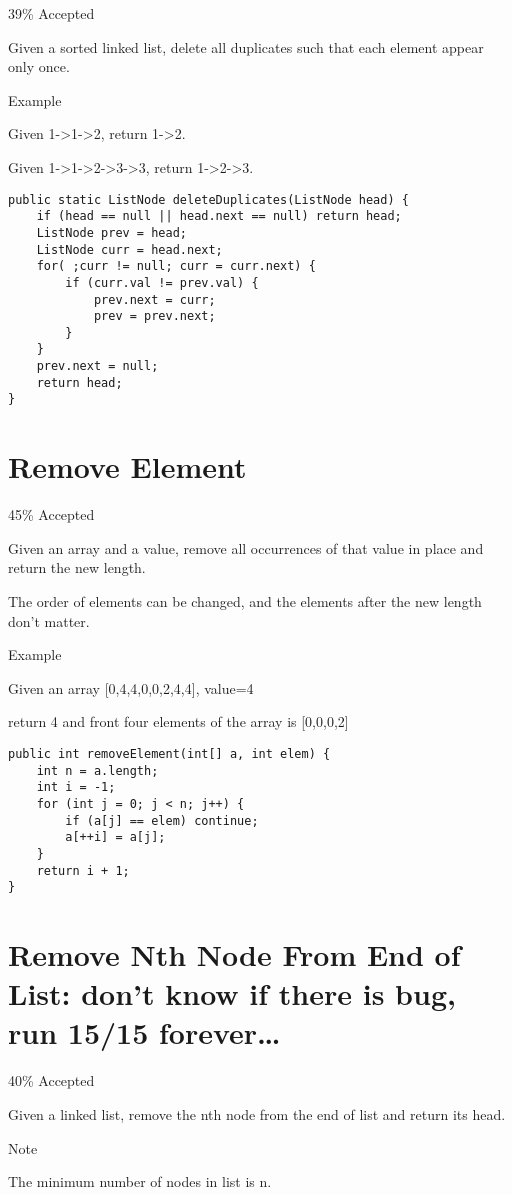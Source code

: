 \documentclass[12pt]{book}
\begin{document}
39\% Accepted

Given a sorted linked list, delete all duplicates such that each element appear only once.

Example

Given 1->1->2, return 1->2.

Given 1->1->2->3->3, return 1->2->3.
\lstset{language=java,label= ,caption= ,numbers=none}
\begin{lstlisting}
public static ListNode deleteDuplicates(ListNode head) {
    if (head == null || head.next == null) return head;
    ListNode prev = head;
    ListNode curr = head.next;
    for( ;curr != null; curr = curr.next) {
        if (curr.val != prev.val) {
            prev.next = curr;
            prev = prev.next;
        } 
    }
    prev.next = null;
    return head;
}
\end{lstlisting}
\chapter{Remove Element}
\label{sec-55}

45\% Accepted

Given an array and a value, remove all occurrences of that value in place and return the new length.

The order of elements can be changed, and the elements after the new length don't matter.

Example

Given an array [0,4,4,0,0,2,4,4], value=4

return 4 and front four elements of the array is [0,0,0,2]
\lstset{language=java,label= ,caption= ,numbers=none}
\begin{lstlisting}
public int removeElement(int[] a, int elem) {            
    int n = a.length;
    int i = -1;
    for (int j = 0; j < n; j++) {
        if (a[j] == elem) continue;
        a[++i] = a[j];
    }
    return i + 1;
}
\end{lstlisting}
\chapter{Remove Nth Node From End of List: don't know if there is bug, run 15/15 forever\ldots{}}
\label{sec-56}

40\% Accepted

Given a linked list, remove the nth node from the end of list and return its head.

Note

The minimum number of nodes in list is n.
\end{document}
